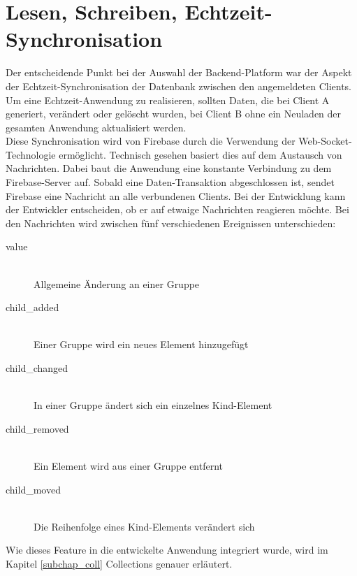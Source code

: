\section{Lesen, Schreiben, Echtzeit-Synchronisation}
Der entscheidende Punkt bei der Auswahl der Backend-Platform war der Aspekt der Echtzeit-Synchronisation der Datenbank zwischen den angemeldeten Clients.
Um eine Echtzeit-Anwendung zu realisieren, sollten Daten, die bei Client A generiert, verändert oder gelöscht wurden, bei Client B ohne ein Neuladen der gesamten Anwendung aktualisiert werden.\\
Diese Synchronisation wird von Firebase durch die Verwendung der Web-Socket-Technologie ermöglicht. Technisch gesehen basiert dies auf dem Austausch von Nachrichten. Dabei baut die Anwendung eine konstante Verbindung
zu dem Firebase-Server auf. Sobald eine Daten-Transaktion abgeschlossen ist, sendet Firebase eine Nachricht an alle verbundenen Clients. Bei der Entwicklung kann der Entwickler entscheiden, ob er auf etwaige Nachrichten reagieren möchte.
Bei den Nachrichten wird zwischen fünf verschiedenen Ereignissen unterschieden:

\begin{description}
\item[value]\hfill \\
Allgemeine Änderung an einer Gruppe
\item[child\_added]\hfill \\ 
Einer Gruppe wird ein neues Element hinzugefügt
\item[child\_changed]\hfill \\ 
In einer Gruppe ändert sich ein einzelnes Kind-Element
\item[child\_removed]\hfill \\ 
Ein Element wird aus einer Gruppe entfernt
\item[child\_moved]\hfill \\ 
Die Reihenfolge eines Kind-Elements verändert sich
\end{description}

Wie dieses Feature in die entwickelte Anwendung integriert wurde, wird im Kapitel \ref{subchap_coll} Collections genauer erläutert.

